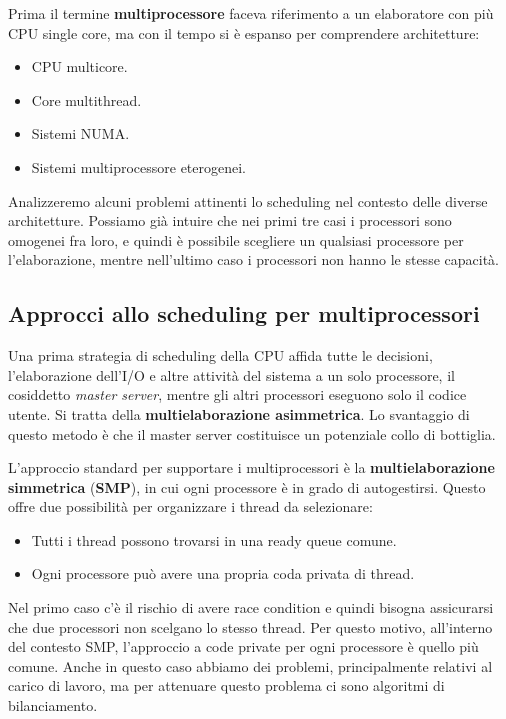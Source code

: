     Prima il termine \textbf{multiprocessore} faceva riferimento a un elaboratore con più CPU single core, ma con il tempo si è espanso per comprendere architetture:
    \begin{itemize}
        \item CPU multicore.
        \item Core multithread.
        \item Sistemi NUMA.
        \item Sistemi multiprocessore eterogenei.
    \end{itemize}
    
    Analizzeremo alcuni problemi attinenti lo scheduling nel contesto delle diverse architetture. Possiamo già intuire che nei primi tre casi i processori sono omogenei fra loro, e quindi è possibile scegliere un qualsiasi processore per l'elaborazione, mentre nell'ultimo caso i processori non hanno le stesse capacità.
    
    \subsection{Approcci allo scheduling per multiprocessori}
        Una prima strategia di scheduling della CPU affida tutte le decisioni, l'elaborazione dell'I/O e altre attività del sistema a un solo processore, il cosiddetto \textit{master server}, mentre gli altri processori eseguono solo il codice utente. Si tratta della \textbf{multielaborazione asimmetrica}. Lo svantaggio di questo metodo è che il master server costituisce un potenziale collo di bottiglia.
        
        L'approccio standard per supportare i multiprocessori è la \textbf{multielaborazione simmetrica} (\textbf{SMP}), in cui ogni processore è in grado di autogestirsi. Questo offre due possibilità per organizzare i thread da selezionare:
        \begin{itemize}
            \item Tutti i thread possono trovarsi in una ready queue comune.
            \item Ogni processore può avere una propria coda privata di thread.
        \end{itemize}
        
        Nel primo caso c'è il rischio di avere race condition e quindi bisogna assicurarsi che due processori non scelgano lo stesso thread. Per questo motivo, all'interno del contesto SMP, l'approccio a code private per ogni processore è quello più comune. Anche in questo caso abbiamo dei problemi, principalmente relativi al carico di lavoro, ma per attenuare questo problema ci sono algoritmi di bilanciamento.
        

